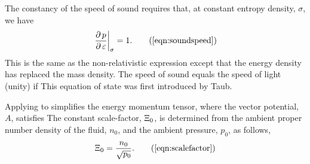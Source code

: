 The constancy of the speed of sound requires that, at constant entropy density, $\sigma$, we have\cite{LandauBook,Taub1978} 
\begin{align}
  \given{\frac{\d p}{\d \epsillon}}{\sigma} = 1. 
\tag{\ref{eqn:soundspeed}}
\end{align}
This is the same as the non-relativistic expression except that the energy density has replaced the mass density.
The speed of sound equals the speed of light (unity) if 
This equation of state was first introduced by Taub\cite{Taub1978}.




Applying  to  simplifies the energy momentum tensor,
where the vector potential, $A$,  satisfies
The constant scale-factor, $\Xi_0$, is determined from the ambient proper number density of the fluid, $n_0$, and the ambient pressure, $p_0$, as follows,
\begin{align}
\scalefactor = \frac{n_0}{\sqrt{p_0}}. 
\tag{\ref{eqn:scalefactor}}
\end{align}

